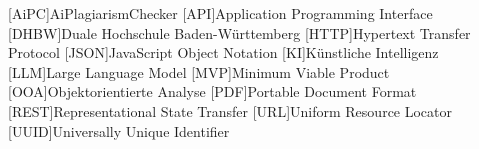 \addchap*{\langacronyms}
\begin{acronym}
    [AiPC]{AiPlagiarismChecker}
    [API]{Application Programming Interface}
    [DHBW]{Duale Hochschule Ba\-den-\-Würt\-tem\-berg}
    [HTTP]{Hypertext Transfer Protocol}
    [JSON]{JavaScript Object Notation}
    [KI]{Künstliche Intelligenz}
    [LLM]{Large Language Model}
    [MVP]{Minimum Viable Product}
    [OOA]{Objektorientierte Analyse}
    [PDF]{Portable Document Format}
    [REST]{Representational State Transfer}
    [URL]{Uniform Resource Locator}
    [UUID]{Universally Unique Identifier}
\end{acronym}